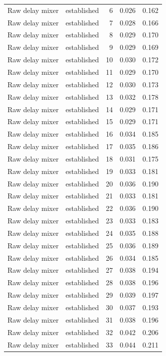 \begin{tabular}{llrrr}
Raw delay mixer & established & 6 & 0.026 & 0.162 \\
Raw delay mixer & established & 7 & 0.028 & 0.166 \\
Raw delay mixer & established & 8 & 0.029 & 0.170 \\
Raw delay mixer & established & 9 & 0.029 & 0.169 \\
Raw delay mixer & established & 10 & 0.030 & 0.172 \\
Raw delay mixer & established & 11 & 0.029 & 0.170 \\
Raw delay mixer & established & 12 & 0.030 & 0.173 \\
Raw delay mixer & established & 13 & 0.032 & 0.178 \\
Raw delay mixer & established & 14 & 0.029 & 0.171 \\
Raw delay mixer & established & 15 & 0.029 & 0.171 \\
Raw delay mixer & established & 16 & 0.034 & 0.185 \\
Raw delay mixer & established & 17 & 0.035 & 0.186 \\
Raw delay mixer & established & 18 & 0.031 & 0.175 \\
Raw delay mixer & established & 19 & 0.033 & 0.181 \\
Raw delay mixer & established & 20 & 0.036 & 0.190 \\
Raw delay mixer & established & 21 & 0.033 & 0.181 \\
Raw delay mixer & established & 22 & 0.036 & 0.190 \\
Raw delay mixer & established & 23 & 0.033 & 0.183 \\
Raw delay mixer & established & 24 & 0.035 & 0.188 \\
Raw delay mixer & established & 25 & 0.036 & 0.189 \\
Raw delay mixer & established & 26 & 0.034 & 0.185 \\
Raw delay mixer & established & 27 & 0.038 & 0.194 \\
Raw delay mixer & established & 28 & 0.038 & 0.196 \\
Raw delay mixer & established & 29 & 0.039 & 0.197 \\
Raw delay mixer & established & 30 & 0.037 & 0.193 \\
Raw delay mixer & established & 31 & 0.038 & 0.196 \\
Raw delay mixer & established & 32 & 0.042 & 0.206 \\
Raw delay mixer & established & 33 & 0.044 & 0.211 \\

\end{tabular}
